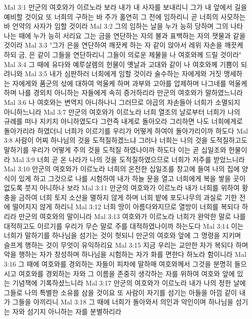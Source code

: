 Mal 3:1  만군의 여호와가 이르노라 보라 내가 내 사자를 보내리니 그가 내 앞에서 길을 예비할 것이요 또 너희의 구하는 바 주가 홀연히 그 전에 임하리니 곧 너희의 사모하는 바 언약의 사자가 임할 것이라
Mal 3:2  그의 임하는 날을 누가 능히 당하며 그의 나타나는 때에 누가 능히 서리요 그는 금을 연단하는 자의 불과 표백하는 자의 잿물과 같을 것이라
Mal 3:3  "그가 은을 연단하여 깨끗케 하는 자 같이 앉아서 레위 자손을 깨끗케 하되 금, 은 같이 그들을 연단하리니 그들이 의로운 제물을 나 여호와께 드릴 것이라"
Mal 3:4  그 때에 유다와 예루살렘의 헌물이 옛날과 고대와 같이 나 여호와께 기쁨이 되려니와
Mal 3:5  내가 심판하러 너희에게 임할 것이라 술수하는 자에게와 거짓 맹세하는 자에게와 품군의 삯에 대하여 억울케 하며 과부와 고아를 압제하며 나그네를 억울케 하며 나를 경외치 아니하는 자들에게 속히 증거하리라 만군의 여호와가 말하였느니라
Mal 3:6  나 여호와는 변역지 아니하나니 그러므로 야곱의 자손들아 너희가 소멸되지 아니하느니라
Mal 3:7  만군의 여호와가 이르노라 너희 열조의 날로부터 너희가 나의 규례를 떠나 지키지 아니하였도다 그런즉 내게로 돌아오라 그리하면 나도 너희에게로 돌아가리라 하였더니 너희가 이르기를 우리가 어떻게 하여야 돌아가리이까 하도다
Mal 3:8  사람이 어찌 하나님의 것을 도적질하겠느냐 그러나 너희는 나의 것을 도적질하고도 말하기를 우리가 어떻게 주의 것을 도적질 하였나이까 하도다 이는 곧 십일조와 헌물이라
Mal 3:9  너희 곧 온 나라가 나의 것을 도적질하였으므로 너희가 저주를 받았느니라
Mal 3:10  만군의 여호와가 이르노라 너희의 온전한 십일조를 창고에 들여 나의 집에 양식이 있게 하고 그것으로 나를 시험하여 내가 하늘 문을 열고 너희에게 복을 쌓을 곳이 없도록 붓지 아니하나 보라
Mal 3:11  만군의 여호와가 이르노라 내가 너희를 위하여 황충을 금하여 너희 토지 소산을 멸하지 않게 하며 너희 밭에 포도나무의 과실로 기한 전에 떨어지지 않게 하리니
Mal 3:12  너희 땅이 아름다와지므로 열방이 너희를 복되다 하리라 만군의 여호와의 말이니라
Mal 3:13  여호와가 이르노라 너희가 완악한 말로 나를 대적하고도 이르기를 우리가 무슨 말로 주를 대적하였나이까 하는도다
Mal 3:14  이는 너희가 말하기를 하나님을 섬기는 것이 헛되니 만군의 여호와 앞에 그 명령을 지키며 슬프게 행하는 것이 무엇이 유익하리요
Mal 3:15  지금 우리는 교만한 자가 복되다 하며 악을 행하는 자가 창성하며 하나님을 시험하는 자가 화를 면한다 하노라 함이니라
Mal 3:16  그 때에 여호와를 경외하는 자들이 피차에 말하매 여호와께서 그것을 분명히 들으시고 여호와를 경외하는 자와 그 이름을 존중히 생각하는 자를 위하여 여호와 앞에 있는 기념책에 기록하셨느니라
Mal 3:17  만군의 여호와가 이르노라 내가 나의 정한 날에 그들로 나의 특별한 소유를 삼을 것이요 또 사람이 자기를 섬기는 아들을 아낌 같이 내가 그들을 아끼리니
Mal 3:18  그 때에 너희가 돌아와서 의인과 악인이며 하나님을 섬기는 자와 섬기지 아니하는 자를 분별하리라
